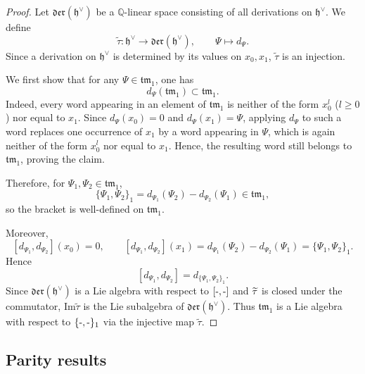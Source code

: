 \documentclass[15pt,oneside,reqno]{amsart}
\theoremstyle{remark}{
\newtheorem{lem}[df]{Lemma}
\newtheorem{prop}[df]{Proposition}
\newtheorem{ex}[df]{Example}
\newtheorem{rmk}[df]{Remark}
}
\newcommand{\ide}[1]{\mathfrak{#1}}
\newcommand{\Q}{\mathbb{Q}}
\let\Im\relax
\newcommand{\Im}{\textrm{Im}}
\newcommand{\der}{\mathfrak{der}}
\newcommand{\tm}{\mathfrak{tm}}
\begin{document}
\begin{proof}
Let $\der(\ide{h}^{\vee})$ be a $\Q$-linear space consisting of all derivations on $\ide{h}^{\vee}$.
We define
\[
\widetilde{\tau}:\ide{h}^{\vee}\to \der(\ide{h}^{\vee}),\qquad
\Psi\mapsto d_\Psi.
\]
Since a derivation on \(\ide{h}^{\vee}\) is determined by its values on \(x_0,x_1\), $\widetilde{\tau}$ is an injection.

We first show that for any \(\Psi\in \tm_1\), one has
\[
d_\Psi(\tm_1)\subset \tm_1.
\]
Indeed, every word appearing in an element of \(\tm_1\) is neither of the form \(x_0^l\) (\(l\ge 0\)) nor equal to \(x_1\). Since \(d_\Psi(x_0)=0\) and \(d_\Psi(x_1)=\Psi\), applying \(d_\Psi\) to such a word replaces one occurrence of \(x_1\) by a word appearing in \(\Psi\), which is again neither of the form \(x_0^l\) nor equal to \(x_1\). Hence, the resulting word still belongs to \(\tm_1\), proving the claim.

Therefore, for \(\Psi_1,\Psi_2\in \tm_1\),
\[
\{\Psi_1,\Psi_2\}_1
=
d_{\Psi_1}(\Psi_2)-d_{\Psi_2}(\Psi_1)\in \tm_1,
\]
so the bracket is well-defined on \(\tm_1\).

Moreover,
\[
[d_{\Psi_1},d_{\Psi_2}](x_0)=0,\qquad
[d_{\Psi_1},d_{\Psi_2}](x_1)
=
d_{\Psi_1}(\Psi_2)-d_{\Psi_2}(\Psi_1)
=
\{\Psi_1,\Psi_2\}_1.
\]
Hence
\[
[d_{\Psi_1},d_{\Psi_2}]
=
d_{\{\Psi_1,\Psi_2\}_1}.
\]
Since $\der(\ide{h}^{\vee})$ is a Lie algebra with respect to $[\mathchar`-,\mathchar`-]$ and $\Im \widetilde{\tau}$ is closed under the commutator, $\mathrm{Im} \widetilde{\tau}$ is the Lie subalgebra of $\der(\ide{h}^{\vee})$.
Thus $\tm_1$ is a Lie algebra with respect to $\{\mathchar`-,\mathchar`-\}_1$ via the injective map $\widetilde{\tau}$.
\end{proof}


\subsection{Parity results}
\end{document}
